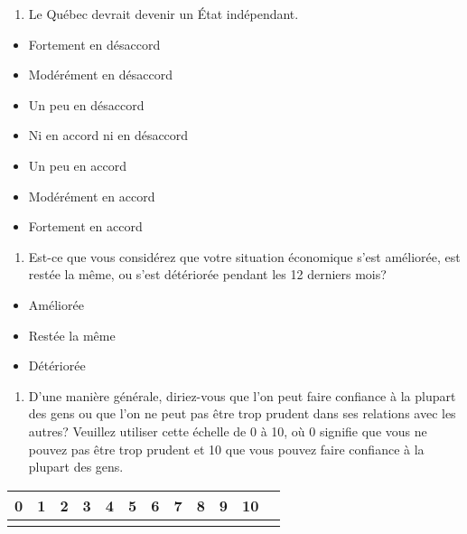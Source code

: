 \documentclass[
  letterpaper,
  DIV=11,
  numbers=noendperiod]{scrreprt}
\providecommand{\tightlist}{%
  \setlength{\itemsep}{0pt}\setlength{\parskip}{0pt}}\usepackage{longtable,booktabs,array}
\begin{document}
\begin{enumerate}
\def\labelenumi{\arabic{enumi}.}
\setcounter{enumi}{28}
\tightlist
\item
  Le Québec devrait devenir un État indépendant.
\end{enumerate}

\begin{itemize}
\tightlist
\item
  Fortement en désaccord
\item
  Modérément en désaccord
\item
  Un peu en désaccord
\item
  Ni en accord ni en désaccord
\item
  Un peu en accord
\item
  Modérément en accord
\item
  Fortement en accord
\end{itemize}

\begin{enumerate}
\def\labelenumi{\arabic{enumi}.}
\setcounter{enumi}{29}
\tightlist
\item
  Est-ce que vous considérez que votre situation économique s'est
  améliorée, est restée la même, ou s'est détériorée pendant les 12
  derniers mois?
\end{enumerate}

\begin{itemize}
\tightlist
\item
  Améliorée
\item
  Restée la même
\item
  Détériorée
\end{itemize}

\begin{enumerate}
\def\labelenumi{\arabic{enumi}.}
\setcounter{enumi}{30}
\tightlist
\item
  D'une manière générale, diriez-vous que l'on peut faire confiance à la
  plupart des gens ou que l'on ne peut pas être trop prudent dans ses
  relations avec les autres? Veuillez utiliser cette échelle de 0 à 10,
  où 0 signifie que vous ne pouvez pas être trop prudent et 10 que vous
  pouvez faire confiance à la plupart des gens.
\end{enumerate}

\begin{longtable}[]{@{}llllllllllll@{}}
\toprule\noalign{}
0 & 1 & 2 & 3 & 4 & 5 & 6 & 7 & 8 & 9 & 10 & \\
\midrule\noalign{}
\endhead
\bottomrule\noalign{}
\endlastfoot
\end{longtable}
\end{document}
